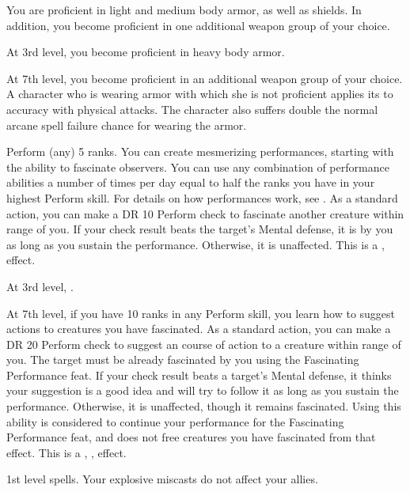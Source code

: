     \featben You are proficient in light and medium body armor, as well as shields.
    In addition, you become proficient in one additional weapon group of your choice.

    At 3rd level, you become proficient in heavy body armor.

    At 7th level, you become proficient in an additional weapon group of your choice.
    A character who is wearing armor with which she is not proficient applies its  to accuracy with physical attacks.
    The character also suffers double the normal arcane spell failure chance for wearing the armor.

    \featpre Perform (any) 5 ranks.
    \featben You can create mesmerizing performances, starting with the ability to fascinate observers.
    You can use any combination of performance abilities a number of times per day equal to half the ranks you have in your highest Perform skill.
    For details on how performances work, see .
    \featben As a standard action, you can make a DR 10 Perform check to fascinate another creature within \rngmed range of you.
    If your check result beats the target's Mental defense, it is \fascinated by you as long as you sustain the performance.
    Otherwise, it is unaffected.
    This is a ,  effect.

    At 3rd level, \tdash.

    At 7th level, if you have 10 ranks in any Perform skill, you learn how to suggest actions to creatures you have fascinated.
    As a standard action, you can make a DR 20 Perform check to suggest an course of action to a creature within \rngmed range of you.
    The target must be already fascinated by you using the Fascinating Performance feat.
    If your check result beats a target's Mental defense, it thinks your suggestion is a good idea and will try to follow it as long as you sustain the performance.
    Otherwise, it is unaffected, though it remains fascinated.
    Using this ability is considered to continue your performance for the Fascinating Performance feat, and does not free creatures you have fascinated from that effect.
    This is a , ,  effect.

    \featpre 1st level spells.
    \featben Your explosive miscasts do not affect your allies.

